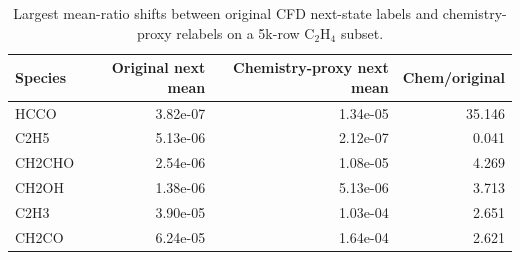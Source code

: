 \begin{table}[t]
\centering
\small
\caption{Largest mean-ratio shifts between original CFD next-state labels and chemistry-proxy relabels on a 5k-row C$_2$H$_4$ subset.}
\label{tab:c2h4-chemproxy-mismatch}
\begin{tabular}{lrrr}
\toprule
Species & Original next mean & Chemistry-proxy next mean & Chem/original \\
\midrule
HCCO & 3.82e-07 & 1.34e-05 & 35.146 \\
C2H5 & 5.13e-06 & 2.12e-07 & 0.041 \\
CH2CHO & 2.54e-06 & 1.08e-05 & 4.269 \\
CH2OH & 1.38e-06 & 5.13e-06 & 3.713 \\
C2H3 & 3.90e-05 & 1.03e-04 & 2.651 \\
CH2CO & 6.24e-05 & 1.64e-04 & 2.621 \\
\bottomrule
\end{tabular}
\end{table}
